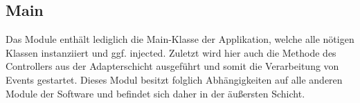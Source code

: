 \subsection{Main}
Das Module  enthält lediglich die Main-Klasse der Applikation, welche alle nötigen Klassen instanziiert und ggf. injected. Zuletzt wird hier auch die Methode  des Controllers aus der Adapterschicht ausgeführt und somit die Verarbeitung von Events gestartet. Dieses Modul besitzt folglich Abhängigkeiten auf alle anderen Module der Software und befindet sich daher in der äußersten Schicht.
